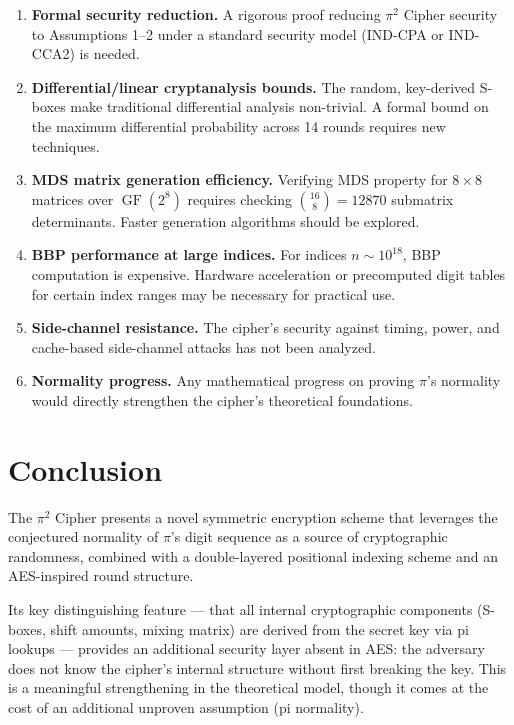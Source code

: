 \documentclass[12pt, a4paper]{article}
\DeclareMathOperator{\GF}{GF}
\begin{document}
\begin{enumerate}[leftmargin=*, label=\arabic*.]
  \item \textbf{Formal security reduction.} A rigorous proof reducing $\pi^2$ Cipher security to Assumptions 1--2 under a standard security model (IND-CPA or IND-CCA2) is needed.

  \item \textbf{Differential/linear cryptanalysis bounds.} The random, key-derived S-boxes make traditional differential analysis non-trivial. A formal bound on the maximum differential probability across 14 rounds requires new techniques.

  \item \textbf{MDS matrix generation efficiency.} Verifying MDS property for $8 \times 8$ matrices over $\GF(2^8)$ requires checking $\binom{16}{8} = 12870$ submatrix determinants. Faster generation algorithms should be explored.

  \item \textbf{BBP performance at large indices.} For indices $n \sim 10^{18}$, BBP computation is expensive. Hardware acceleration or precomputed digit tables for certain index ranges may be necessary for practical use.

  \item \textbf{Side-channel resistance.} The cipher's security against timing, power, and cache-based side-channel attacks has not been analyzed.

  \item \textbf{Normality progress.} Any mathematical progress on proving $\pi$'s normality would directly strengthen the cipher's theoretical foundations.
\end{enumerate}

\section{Conclusion}

The $\pi^2$ Cipher presents a novel symmetric encryption scheme that leverages the conjectured normality of $\pi$'s digit sequence as a source of cryptographic randomness, combined with a double-layered positional indexing scheme and an AES-inspired round structure.

Its key distinguishing feature — that all internal cryptographic components (S-boxes, shift amounts, mixing matrix) are derived from the secret key via pi lookups — provides an additional security layer absent in AES: the adversary does not know the cipher's internal structure without first breaking the key. This is a meaningful strengthening in the theoretical model, though it comes at the cost of an additional unproven assumption (pi normality).
\end{document}
